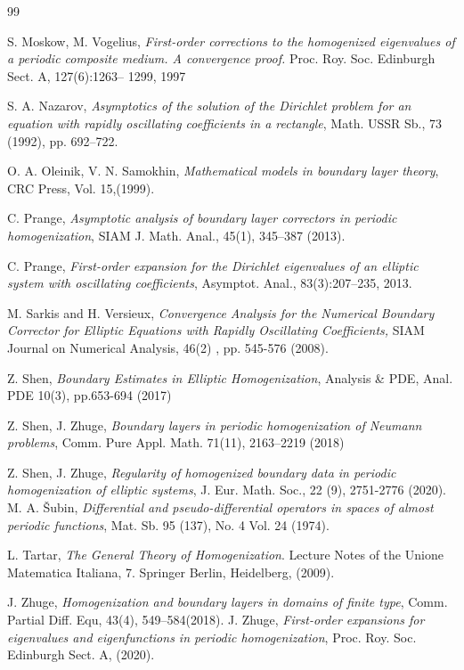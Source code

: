 \documentclass[11pt, reqno]{amsart}
\theoremstyle{definition}
\theoremstyle{remark}
\numberwithin{equation}{section}
\begin{document}
\begin{thebibliography}{99}
		
		 S. Moskow, M. Vogelius, \emph {
			First-order corrections to the homogenized eigenvalues of a
			periodic composite medium. A convergence proof.} Proc. Roy. Soc. Edinburgh Sect. A, 127(6):1263–
		1299, 1997
		
				S. A. Nazarov, \emph{Asymptotics of the solution of the Dirichlet problem for an equation with
			rapidly oscillating coefficients in a rectangle}, Math. USSR Sb., 73 (1992), pp. 692–722.
		
		 O. A. Oleinik, V. N. Samokhin,
		\emph{Mathematical models in boundary layer theory}, CRC Press,
		Vol. 15,(1999).
		
		 C. Prange, \emph{Asymptotic  analysis of boundary layer correctors in periodic homogenization}, SIAM J. Math. Anal., 45(1), 345--387 (2013).
		
		 C. Prange, \emph{First-order expansion for the Dirichlet eigenvalues of an elliptic system with oscillating coefficients}, Asymptot. Anal., 83(3):207–235, 2013.
	
		
			M. Sarkis and H. Versieux, \emph{Convergence Analysis for the Numerical Boundary Corrector for Elliptic Equations with Rapidly Oscillating Coefficients,}
		SIAM Journal on Numerical Analysis, 46(2) , pp. 545-576 (2008).
		
	 Z. Shen, \emph{Boundary Estimates in Elliptic Homogenization}, Analysis \& PDE, Anal. PDE 10(3), pp.653-694 (2017)
		
			Z. Shen, J. Zhuge,  \emph{Boundary layers in periodic homogenization of Neumann problems}, Comm. Pure
		Appl. Math. 71(11), 2163–2219 (2018)
		
		
		 Z. Shen, J. Zhuge, \emph{Regularity of  homogenized boundary data in periodic homogenization of elliptic systems},	J. Eur. Math. Soc., 22 (9), 2751-2776 (2020).
		M. A. Šubin, \emph{ Differential and pseudo-differential operators in spaces of almost periodic functions}, Mat. Sb. 95 (137), No. 4 Vol. 24 (1974).
	
		
			L. Tartar, \emph{The General Theory of Homogenization}. Lecture Notes of the Unione Matematica Italiana, 7. Springer Berlin, Heidelberg, (2009).
		
		  J. Zhuge, \emph{Homogenization and boundary layers in domains of finite type},	Comm. Partial Diff. Equ, 43(4), 549--584(2018).
		  J. Zhuge, \emph{First-order expansions for eigenvalues and eigenfunctions in periodic homogenization},  Proc. Roy. Soc. Edinburgh Sect. A, (2020).\\	
		

		
	\end{thebibliography}
	
	
	
	
\end{document}
